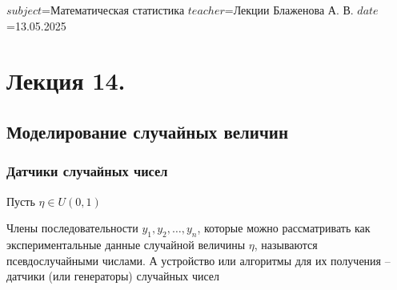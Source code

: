 $subject$=Математическая статистика
$teacher$=Лекции Блаженова А. В.
$date$=13.05.2025

\section{Лекция 14.}

\subsection{Моделирование случайных величин}

\subsubsection{Датчики случайных чисел}

Пусть $\eta \in U(0, 1)$

\Def Члены последовательности $y_1, y_2, \dots, y_n$, которые можно рассматривать как экспериментальные данные случайной величины $\eta$, называются псевдослучайными числами. А устройство или алгоритмы для их получения -- датчики (или генераторы) случайных чисел

